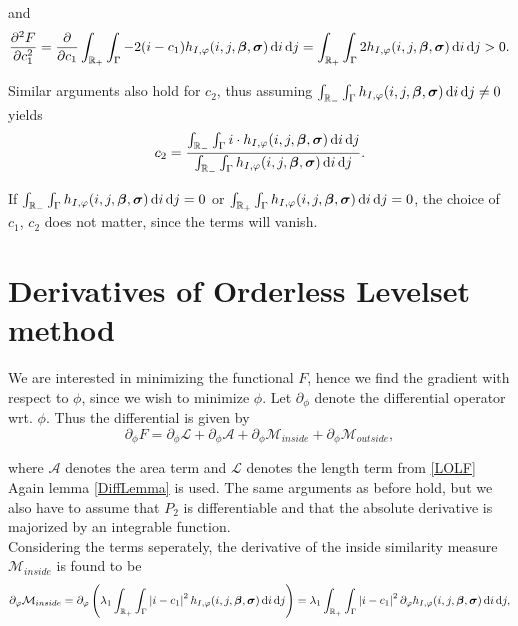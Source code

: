 and 
\begin{equation}
  \frac{\partial^2 F}{\partial c_1^2} = \frac{\partial}{\partial c_1}\int_{\mathbb R_+}\int_{\Gamma}-2(i-c_1) h_{I,\varphi}(i,j,\boldsymbol{\beta} ,\boldsymbol{\sigma} ) \,{\rm d} i\,{\rm d} j = \int_{\mathbb R_+}\int_{\Gamma}2 h_{I,\varphi}(i,j,\boldsymbol{\beta} ,\boldsymbol{\sigma} ) \,{\rm d} i\,{\rm d} j>0.
\end{equation}

Similar arguments also hold for $c_2$, thus assuming $\int_{\mathbb R_-}\int_{\Gamma}h_{I,\varphi}(i,j,\boldsymbol{\beta} ,\boldsymbol{\sigma} ) \,{\rm d} i\,{\rm d} j\neq 0$ yields
\begin{equation}
  c_2 = \frac{\int_{\mathbb R_-}\int_{\Gamma} i\cdot h_{I,\varphi}(i,j,\boldsymbol{\beta} ,\boldsymbol{\sigma} ) \,{\rm d} i\,{\rm d} j}{\int_{\mathbb R_-}\int_{\Gamma}h_{I,\varphi}(i,j,\boldsymbol{\beta} ,\boldsymbol{\sigma} ) \,{\rm d} i\,{\rm d} j}.
\end{equation}

If $\int_{\mathbb R_-}\int_{\Gamma}h_{I,\varphi}(i,j,\boldsymbol{\beta} ,\boldsymbol{\sigma} ) \,{\rm d} i\,{\rm d} j=0$ or $\int_{\mathbb R_+}\int_{\Gamma}h_{I,\varphi}(i,j,\boldsymbol{\beta} ,\boldsymbol{\sigma} ) \,{\rm d} i\,{\rm d} j = 0$, the choice of $c_1$, $c_2$ does not matter, since the terms will vanish.


\section{Derivatives of Orderless Levelset method}\label{section:OLder}
We are interested in minimizing the functional $F$, hence we find the gradient with respect to $\phi$, since we wish to minimize $\phi$. Let $\partial_\phi$ denote the differential operator wrt. $\phi$. Thus the differential is given by
\begin{equation}
  \partial_\phi F = \partial_\phi \mathcal{L} + \partial_\phi \mathcal{A} + \partial_\phi\mathcal{M}_{inside} + \partial_\phi \mathcal{M}_{outside},
\end{equation}

where $\mathcal{A}$ denotes the area term and $\mathcal{L}$ denotes the length term from \eqref{LOLF}\\

Again lemma \ref{DiffLemma} is used. The same arguments as before hold, but we also have to assume that $P_2$ is differentiable and that the absolute derivative is majorized by an integrable function.\\
Considering the terms seperately, the derivative of the inside similarity measure $\mathcal{M}_{inside}$ is found to be
\begin{equation}
  \partial_\varphi \mathcal{M}_{inside} = \partial_\varphi \left( \lambda_1\int_{\mathbb R_+} \int_{\Gamma} \left| {i-c_1} \right|^2h_{I,\varphi}(i,j,\boldsymbol{\beta} ,\boldsymbol{\sigma} )\,{\rm d} i\,{\rm d} j\right) = \lambda_1\int_{\mathbb R_+} \int_{\Gamma} \left| {i-c_1} \right|^2 \partial_\varphi h_{I,\varphi}(i,j,\boldsymbol{\beta} ,\boldsymbol{\sigma} )\,{\rm d} i\,{\rm d} j,
\end{equation}

